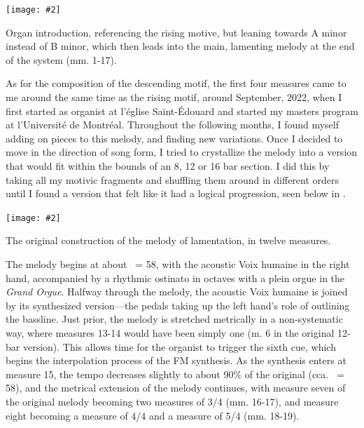 \documentclass[12pt,twoside,maitrise]{dms_ks}
\newcommand{\customincludeexamples}[4][]{%
    \begin{example}[H]
        \centering
        \texttt{[image: \#2]}
        \caption{#4}
	\label{#3} 
    \end{example}
}
\theoremstyle{definition}
\begin{document}
{{\customincludeexamples[width=\textwidth]{3e_2}{ex:3e_2}{Organ introduction, referencing the rising motive, but leaning towards A minor instead of B minor, which then leads into the main, lamenting melody at the end of the system (mm. 1-17).}

As for the composition of the descending motif, the first four measures came to me around the same time as the rising motif, around September, 2022, when I first started as organist at l'église Saint-Édouard and started my masters program at l'Université de Montréal.  
Throughout the following months, I found myself adding on pieces to this melody, and finding new variations.  
Once I decided to move in the direction of song form, I tried to crystallize the melody into a version that would fit within the bounds of an 8, 12 or 16 bar section. 
I did this by taking all my motivic fragments and shuffling them around in different orders until I found a version that felt like it had a logical progression, seen below in .  

\customincludeexamples[scale=0.6]{3e_3}{ex:3e_3}{The original construction of the melody of lamentation, in twelve measures.}

The melody begins at about \musQuarter\ = 58, with the acoustic Voix humaine in the right hand, accompanied by a rhythmic ostinato in octaves with a plein orgue in the \textit{Grand Orgue}. 
Halfway through the melody, the acoustic Voix humaine is joined by its synthesized version---the pedals taking up the left hand's role of outlining the bassline. 
Just prior, the melody is stretched metrically in a non-systematic way, where measures 13-14 would have been simply one (m. 6 in the original 12-bar version). 
This allows time for the organist to trigger the sixth cue, which begins the interpolation process of the FM synthesis. 
As the synthesis enters at measure 15, the tempo decreases slightly to about 90\% of the original (cca. \musQuarter\ = 58), and the metrical extension of the melody continues, with measure seven of the original melody becoming two measures of 3/4 (mm. 16-17), and measure eight becoming a measure of 4/4 and a measure of 5/4 (mm. 18-19). 

}}
\end{document}
